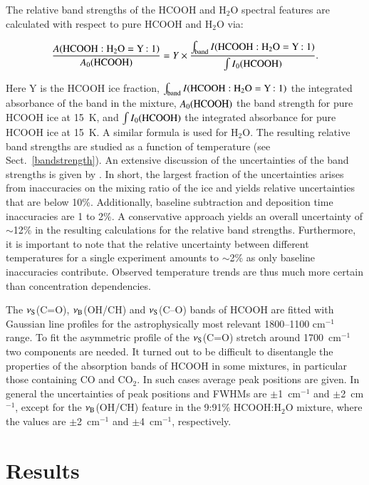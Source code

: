 \documentclass{aa}
\begin{document}
The relative band strengths of the HCOOH and H$_2$O spectral features
are calculated with respect to pure HCOOH and H$_2$O via:

\begin{equation}
\frac{A{\rm (HCOOH:H_2O=Y:1)}}{A {\rm_0 (HCOOH)}} = Y \times
\frac{\int_{\rm band} I{\rm (HCOOH:H_2O=Y:1)}}{\int I{\rm_0 (HCOOH)}}.
\end{equation}

\noindent Here Y is the HCOOH ice fraction, $\int_{\rm band} I{\rm
  (HCOOH:H_2O=Y:1)}$ the integrated absorbance of the band in the
mixture, $A{\rm_0 (HCOOH)}$ the band strength for pure HCOOH ice at
15~K, and $\int I{\rm_0 (HCOOH)}$ the integrated absorbance for pure
HCOOH ice at 15~K. A similar formula is used for H$_2$O. The resulting
relative band strengths are studied as a function of temperature (see
Sect.~\ref{bandstrength}). An extensive discussion of the
uncertainties of the band strengths is given by \citet{oberg2007}. In
short, the largest fraction of the uncertainties arises from
inaccuracies on the mixing ratio of the ice and yields relative
uncertainties that are below 10\%. Additionally, baseline subtraction
and deposition time inaccuracies are 1 to 2\%. A conservative approach
yields an overall uncertainty of $\sim$12\% in the resulting
calculations for the relative band strengths. Furthermore, it is
important to note that the relative uncertainty between different
temperatures for a single experiment amounts to $\sim$2\% as only
baseline inaccuracies contribute. Observed temperature trends are thus
much more certain than concentration dependencies.

The $\nu_{\rm S}$(C=O), $\nu_{\rm B}$(OH/CH) and $\nu_{\rm S}$(C--O)
bands of HCOOH are fitted with Gaussian line profiles for the
astrophysically most relevant 1800--1100 cm$^{-1}$ range. To fit the
asymmetric profile of the $\nu_{\rm S}$(C=O) stretch around
1700~cm$^{-1}$ two components are needed. It turned out to be
difficult to disentangle the properties of the absorption bands of
HCOOH in some mixtures, in particular those containing CO and
CO$_2$. In such cases average peak positions are given. In general the
uncertainties of peak positions and FWHMs are $\pm$1~cm$^{-1}$ and
$\pm$2~cm$^{-1}$, except for the $\nu_{\rm B}$(OH/CH) feature in the
9:91\% HCOOH:H$_2$O mixture, where the values are $\pm$2~cm$^{-1}$ and
$\pm$4~cm$^{-1}$, respectively.

\section{Results}
\label{res}
\end{document}
